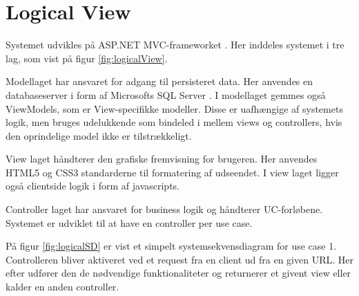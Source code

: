 \section{Logical View}\label{sec:LogicalView}
Systemet udvikles på ASP.NET MVC-frameworket \citep{aspnetmvcWeb}. Her inddeles systemet i tre lag, som vist på figur \ref{fig:logicalView}.


Modellaget har ansvaret for adgang til persisteret data. Her anvendes en databaseserver i form af Microsofts SQL Server \citep{sqlserverWeb}. I modellaget gemmes også ViewModels, som er View-specifikke modeller. Disse er uafhængige af systemets logik, men bruges udelukkende som bindeled i mellem views og controllers, hvis den oprindelige model ikke er tilstrækkeligt.

View laget håndterer den grafiske fremvisning for brugeren. Her anvendes HTML5 og CSS3 standarderne til formatering af udseendet. I view laget ligger også clientside logik i form af javascripts.

Controller laget har ansvaret for business logik og håndterer UC-forløbene. Systemet er udviklet til at have en controller per use case.

På figur \ref{fig:logicalSD} er vist et simpelt systemsekvensdiagram for use case 1. Controlleren bliver aktiveret ved et request fra en client ud fra en given URL. Her efter udfører den de nødvendige funktionaliteter og returnerer et givent view eller kalder en anden controller.

